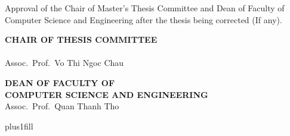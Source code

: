 \documentclass[a4paper,oneside]{book}
\begin{document}
\begin{titlepage}
\begin{flushleft}
    \vspace{0.1cm}

    {{\fontsize{12}{1} Approval of the Chair of Master's Thesis Committee and Dean of Faculty of Computer Science and Engineering after the thesis being corrected (If any).}}
  \end{flushleft}

  \vspace{0.1cm}

  \begin{minipage}[t]{0.45\textwidth}
    \begin{flushleft}
      {\fontsize{8pt}{1}\textbf{CHAIR OF THESIS COMMITTEE}}\\[0.1cm]
      {\fontsize{8pt}{1}\textbf{}}\\[1cm]
      {\fontsize{8pt}{1} Assoc.\ Prof.\ Vo Thi Ngoc Chau}
    \end{flushleft}
  \end{minipage}
  \begin{minipage}[t]{0.55\textwidth}
    \begin{flushleft}
      {\fontsize{8pt}{1}\textbf{DEAN OF FACULTY OF}}\\[0.1cm]
      {\fontsize{8pt}{1}\textbf{COMPUTER SCIENCE AND ENGINEERING}}\\[1cm]
      {\fontsize{8pt}{1} Assoc.\ Prof.\ Quan Thanh Tho}
    \end{flushleft}
  \end{minipage}

  \vskip0pt plus1fill
\end{titlepage}
\end{document}
